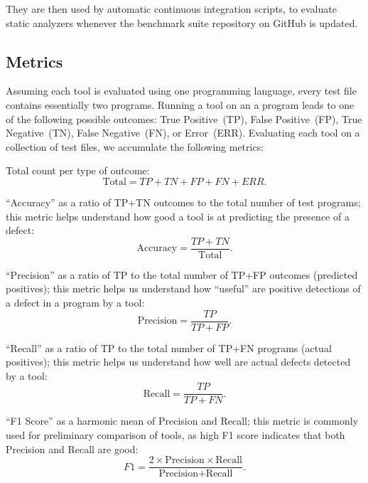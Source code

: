 They are then used by automatic continuous integration scripts, to evaluate static analyzers whenever the benchmark suite repository on GitHub is updated.

\subsection{Metrics}\label{sec:metrics}

Assuming each tool is evaluated using one programming language, every test file contains essentially two programs. Running a tool on an a program leads to one of the following possible outcomes: True Positive~(TP), False Positive~(FP), True Negative~(TN), False Negative~(FN), or Error~(ERR). Evaluating each tool on a collection of test files, we accumulate the following metrics:

Total count per type of outcome:
\begin{equation*}
\text{Total} = TP + TN + FP + FN + ERR.
\end{equation*}

``Accuracy'' as a ratio of TP+TN outcomes to the total number of test programs; this metric helps understand how good a tool is at predicting the presence of a defect:
\begin{equation*}
\text{Accuracy} = \frac{TP + TN}{\text{Total}}.
\end{equation*}

``Precision'' as a ratio of TP to the total number of TP+FP outcomes (predicted positives); this metric helps us understand how ``useful'' are positive detections of a defect in a program by a tool:
\begin{equation*}
\text{Precision} = \frac{TP}{TP + FP}.
\end{equation*}

``Recall'' as a ratio of TP to the total number of TP+FN programs (actual positives); this metric helps us understand how well are actual defects detected by a tool:
\begin{equation*}
\text{Recall} = \frac{TP}{TP + FN}.
\end{equation*}

``F1 Score'' as a harmonic mean of Precision and Recall; this metric is commonly used for preliminary comparison of tools, as high F1 score indicates that both Precision and Recall are good:
\begin{equation*}
F1 = \frac{2 \times \text{Precision} \times \text{Recall}}{\text{Precision} + \text{Recall}}.
\end{equation*}

